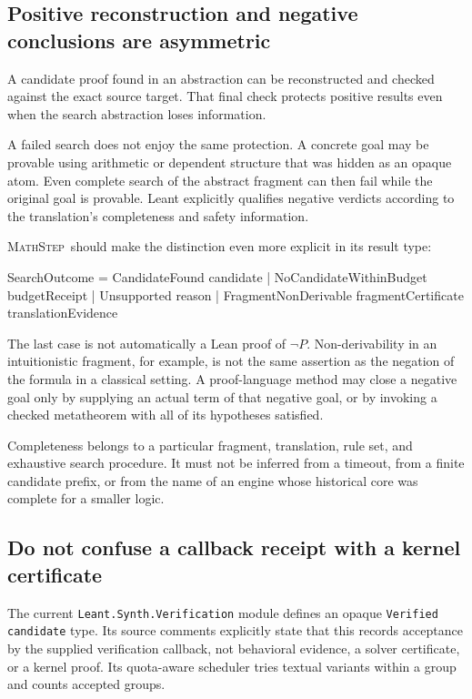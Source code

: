 \documentclass[11pt,a4paper]{article}
\theoremstyle{remark}
\newcommand{\ms}{\textsc{MathStep}}
\newcommand{\ty}[1]{\texttt{#1}}
\begin{document}
\subsection{Positive reconstruction and negative conclusions are asymmetric}
A candidate proof found in an abstraction can be reconstructed and checked against the exact source target. That final check protects positive results even when the search abstraction loses information.

A failed search does not enjoy the same protection. A concrete goal may be provable using arithmetic or dependent structure that was hidden as an opaque atom. Even complete search of the abstract fragment can then fail while the original goal is provable. Leant explicitly qualifies negative verdicts according to the translation's completeness and safety information.\cite{leant-fragment,leant-readme}

\ms\ should make the distinction even more explicit in its result type:
\Needspace{82pt}
\begin{code}
SearchOutcome =
    CandidateFound candidate
  | NoCandidateWithinBudget budgetReceipt
  | Unsupported reason
  | FragmentNonDerivable fragmentCertificate translationEvidence
\end{code}
The last case is not automatically a Lean proof of $\neg P$. Non-derivability in an intuitionistic fragment, for example, is not the same assertion as the negation of the formula in a classical setting. A proof-language method may close a negative goal only by supplying an actual term of that negative goal, or by invoking a checked metatheorem with all of its hypotheses satisfied.

Completeness belongs to a particular fragment, translation, rule set, and exhaustive search procedure. It must not be inferred from a timeout, from a finite candidate prefix, or from the name of an engine whose historical core was complete for a smaller logic.

\subsection{Do not confuse a callback receipt with a kernel certificate}
The current \ty{Leant.Synth.Verification} module defines an opaque \ty{Verified candidate} type. Its source comments explicitly state that this records acceptance by the supplied verification callback, not behavioral evidence, a solver certificate, or a kernel proof. Its quota-aware scheduler tries textual variants within a group and counts accepted groups.\cite{leant-verification}
\end{document}
